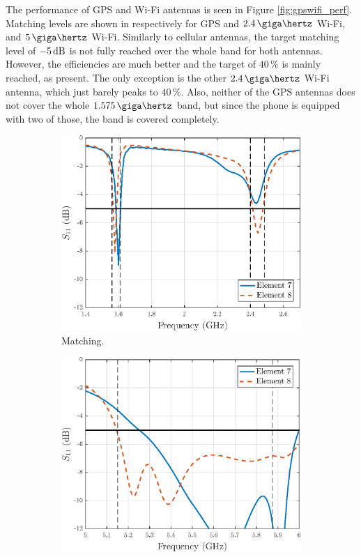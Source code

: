 The performance of GPS and Wi-Fi antennas is seen in Figure \ref{fig:gpswifi_perf}. Matching levels are shown in  respectively for GPS and $2.4\,\giga\hertz$ Wi-Fi, and $5\,\giga\hertz$ Wi-Fi. Similarly to cellular antennas, the target matching level of $-5\,\mathrm{dB}$ is not fully reached over the whole band for both antennas. However, the efficiencies are much better and the target of $40\,\%$ is mainly reached, as  present. The only exception is the other $2.4\,\giga\hertz$ Wi-Fi antenna, which just barely peaks to $40\,\%$. Also, neither of the GPS antennas does not cover the whole $1.575\,\giga\hertz$ band, but since the phone is equipped with two of those, the band is covered completely.
\begin{figure}[H]
\vspace{-5pt}
    \centering
    \begin{subfigure}[b]{0.48\textwidth}
        \includegraphics[width=\textwidth]{img/wifilow_match_wgps.eps}
        \caption{Matching.}
        \label{fig:wifilow_match}
    \end{subfigure}
    \begin{subfigure}[b]{0.48\textwidth}
        \includegraphics[width=\textwidth]{img/wifihi_match_wgps.eps}

\end{subfigure}
\end{figure}
